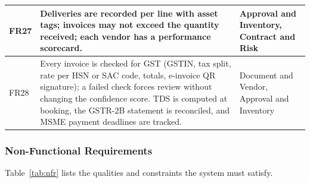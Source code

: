 {\begin{longtable}{|L{0.07\textwidth}|L{0.64\textwidth}|L{0.17\textwidth}|}
FR27 & Deliveries are recorded per line with asset tags; invoices may not exceed the quantity received; each vendor has a performance scorecard. & Approval and Inventory, Contract and Risk \\ \hline
FR28 & Every invoice is checked for GST (GSTIN, tax split, rate per HSN or SAC code, totals, e-invoice QR signature); a failed check forces review without changing the confidence score. TDS is computed at booking, the GSTR-2B statement is reconciled, and MSME payment deadlines are tracked. & Document and Vendor, Approval and Inventory \\ \hline
\end{longtable}}

\subsubsection{Non-Functional Requirements}
Table~\ref{tab:nfr} lists the qualities and constraints the system must satisfy.

